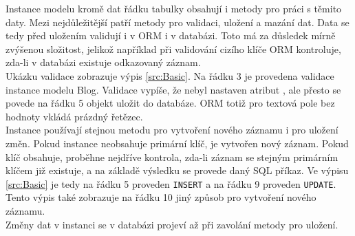 \documentclass[ing,male,java,dept456]{diploma}						%
\begin{document}
Instance modelu kromě dat řádku tabulky obsahují i metody pro práci s těmito daty. Mezi nejdůležitější patří metody pro validaci, uložení a mazání dat. Data se tedy před uložením validují i v ORM i v databázi. Toto má za důsledek mírně zvýšenou složitost, jelikož například při validování cizího klíče ORM kontroluje, zda-li v databázi existuje odkazovaný záznam. \\
Ukázku validace zobrazuje výpis \ref{src:Basic}. Na řádku 3 je provedena validace instance modelu Blog. Validace vypíše, že nebyl nastaven atribut , ale přesto se povede na řádku 5 objekt uložit do databáze. ORM totiž pro textová pole bez hodnoty vkládá prázdný řetězec. \\
Instance používají stejnou metodu pro vytvoření nového záznamu i pro uložení změn. Pokud instance neobsahuje primární klíč, je vytvořen nový záznam. Pokud klíč obsahuje, proběhne nejdříve kontrola, zda-li záznam se stejným primárním klíčem již existuje, a na základě výsledku se provede daný SQL příkaz. Ve výpisu \ref{src:Basic} je tedy na řádku 5 proveden \lstinline[style=customsql]|INSERT| a na řádku 9 proveden \lstinline[style=customsql]|UPDATE|. Tento výpis také zobrazuje na řádku 10 jiný způsob pro vytvoření nového záznamu.\\
Změny dat v instanci se v databázi projeví až při zavolání metody pro uložení. 
\end{document}
